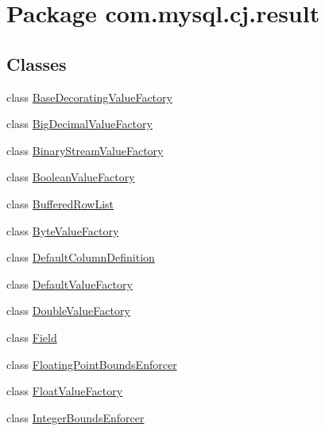 \hypertarget{namespacecom_1_1mysql_1_1cj_1_1result}{}\section{Package com.\+mysql.\+cj.\+result}
\label{namespacecom_1_1mysql_1_1cj_1_1result}
\subsection*{Classes}
\begin{DoxyCompactItemize}
\item 
class \mbox{\hyperlink{classcom_1_1mysql_1_1cj_1_1result_1_1_base_decorating_value_factory}{Base\+Decorating\+Value\+Factory}}
\item 
class \mbox{\hyperlink{classcom_1_1mysql_1_1cj_1_1result_1_1_big_decimal_value_factory}{Big\+Decimal\+Value\+Factory}}
\item 
class \mbox{\hyperlink{classcom_1_1mysql_1_1cj_1_1result_1_1_binary_stream_value_factory}{Binary\+Stream\+Value\+Factory}}
\item 
class \mbox{\hyperlink{classcom_1_1mysql_1_1cj_1_1result_1_1_boolean_value_factory}{Boolean\+Value\+Factory}}
\item 
class \mbox{\hyperlink{classcom_1_1mysql_1_1cj_1_1result_1_1_buffered_row_list}{Buffered\+Row\+List}}
\item 
class \mbox{\hyperlink{classcom_1_1mysql_1_1cj_1_1result_1_1_byte_value_factory}{Byte\+Value\+Factory}}
\item 
class \mbox{\hyperlink{classcom_1_1mysql_1_1cj_1_1result_1_1_default_column_definition}{Default\+Column\+Definition}}
\item 
class \mbox{\hyperlink{classcom_1_1mysql_1_1cj_1_1result_1_1_default_value_factory}{Default\+Value\+Factory}}
\item 
class \mbox{\hyperlink{classcom_1_1mysql_1_1cj_1_1result_1_1_double_value_factory}{Double\+Value\+Factory}}
\item 
class \mbox{\hyperlink{classcom_1_1mysql_1_1cj_1_1result_1_1_field}{Field}}
\item 
class \mbox{\hyperlink{classcom_1_1mysql_1_1cj_1_1result_1_1_floating_point_bounds_enforcer}{Floating\+Point\+Bounds\+Enforcer}}
\item 
class \mbox{\hyperlink{classcom_1_1mysql_1_1cj_1_1result_1_1_float_value_factory}{Float\+Value\+Factory}}
\item 
class \mbox{\hyperlink{classcom_1_1mysql_1_1cj_1_1result_1_1_integer_bounds_enforcer}{Integer\+Bounds\+Enforcer}}

\end{DoxyCompactItemize}
